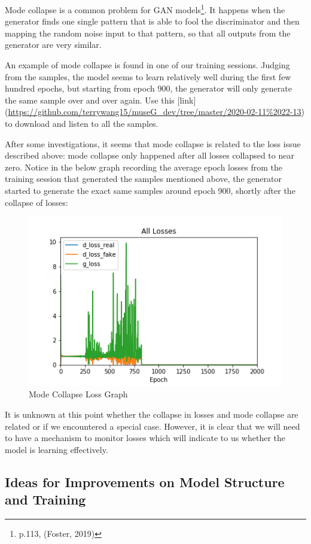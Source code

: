 \documentclass[12pt,oneside]{chicagocapstone}
\begin{document}
Mode collapse is a common problem for GAN models\footnote{p.113, (Foster, 2019)}. It happens when the generator finds one single pattern that is able to fool the discriminator and then mapping the random noise input to that pattern, so that all outputs from the generator are very similar.

An example of mode collapse is found in one of our training sessions. Judging from the samples, the model seems to learn relatively well during the first few hundred epochs, but starting from epoch 900, the generator will only generate the same sample over and over again. Use this {[}link{]} (\url{https://github.com/terrywang15/museG_dev/tree/master/2020-02-11\%2022-13}) to download and listen to all the samples.

After some investigations, it seems that mode collapse is related to the loss issue described above: mode collapse only happened after all losses collapsed to near zero. Notice in the below graph recording the average epoch losses from the training session that generated the samples mentioned above, the generator started to generate the exact same samples around epoch 900, shortly after the collapse of losses:
\begin{figure}

{\centering \includegraphics[width=0.8\linewidth]{figure/all_losses_2} 

}

\caption{Mode Collapse Loss Graph}\label{fig:unnamed-chunk-9}
\end{figure}
It is unknown at this point whether the collapse in losses and mode collapse are related or if we encountered a special case. However, it is clear that we will need to have a mechanism to monitor losses which will indicate to us whether the model is learning effectively.

\hypertarget{ideas-for-improvements-on-model-structure-and-training}{%
\subsection*{Ideas for Improvements on Model Structure and Training}\label{ideas-for-improvements-on-model-structure-and-training}}
\end{document}
